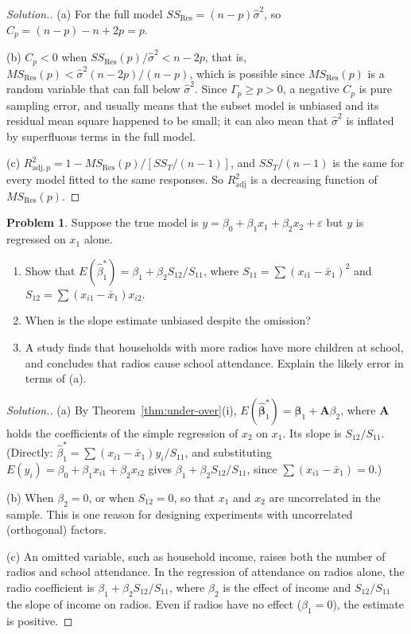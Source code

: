 \documentclass[11pt,a4paper]{article}
\numberwithin{equation}{section}
\theoremstyle{definition}
\newtheorem{problemx}{Problem}[subsection]
\newenvironment{problem}{\begin{problemx}}{\end{problemx}}
\newenvironment{solution}
  {\renewcommand{\qedsymbol}{}\begin{proof}[\textit{Solution}.]}
  {\end{proof}}
\begin{document}
\begin{solution}
(a) For the full model $SS_{\mathrm{Res}} = (n - p)\hat\sigma^2$, so $C_p = (n - p) - n + 2p = p$.

(b) $C_p < 0$ when $SS_{\mathrm{Res}}(p)/\hat\sigma^2 < n - 2p$, that is,
$MS_{\mathrm{Res}}(p) < \hat\sigma^2(n - 2p)/(n - p)$, which is possible since $MS_{\mathrm{Res}}(p)$ is a random
variable that can fall below $\hat\sigma^2$. Since $\Gamma_p \ge p > 0$, a negative $C_p$ is pure sampling
error, and usually means that the subset model is unbiased and its residual mean square happened to
be small; it can also mean that $\hat\sigma^2$ is inflated by superfluous terms in the full model.

(c) $R^2_{\mathrm{adj},p} = 1 - MS_{\mathrm{Res}}(p)\big/[SS_T/(n - 1)]$, and $SS_T/(n - 1)$ is the same for
every model fitted to the same responses. So $R^2_{\mathrm{adj}}$ is a decreasing function of
$MS_{\mathrm{Res}}(p)$.
\end{solution}

\begin{problem}\label{prob:omitted}
Suppose the true model is $y = \beta_0 + \beta_1x_1 + \beta_2x_2 + \varepsilon$ but $y$ is regressed on
$x_1$ alone.
\begin{enumerate}[label=(\alph*)]
\item Show that $E(\hat\beta_1^*) = \beta_1 + \beta_2 S_{12}/S_{11}$, where
$S_{11} = \sum(x_{i1} - \bar x_1)^2$ and $S_{12} = \sum(x_{i1} - \bar x_1)x_{i2}$.
\item When is the slope estimate unbiased despite the omission?
\item A study finds that households with more radios have more children at school, and concludes that
radios cause school attendance. Explain the likely error in terms of (a).
\end{enumerate}
\end{problem}

\begin{solution}
(a) By Theorem~\ref{thm:under-over}(i), $E(\hat{\boldsymbol\beta}_1^*) = \boldsymbol\beta_1 + \mathbf{A}\beta_2$, where
$\mathbf{A}$ holds the coefficients of the simple regression of $x_2$ on $x_1$. Its slope is $S_{12}/S_{11}$.
(Directly: $\hat\beta_1^* = \sum(x_{i1} - \bar x_1)y_i/S_{11}$, and substituting
$E(y_i) = \beta_0 + \beta_1x_{i1} + \beta_2x_{i2}$ gives $\beta_1 + \beta_2S_{12}/S_{11}$, since
$\sum(x_{i1} - \bar x_1) = 0$.)

(b) When $\beta_2 = 0$, or when $S_{12} = 0$, so that $x_1$ and $x_2$ are uncorrelated in the sample.
This is one reason for designing experiments with uncorrelated (orthogonal) factors.

(c) An omitted variable, such as household income, raises both the number of radios and school
attendance. In the regression of attendance on radios alone, the radio coefficient is
$\beta_1 + \beta_2S_{12}/S_{11}$, where $\beta_2$ is the effect of income and $S_{12}/S_{11}$ the slope of
income on radios. Even if radios have no effect ($\beta_1 = 0$), the estimate is positive.
\end{solution}
\end{document}
